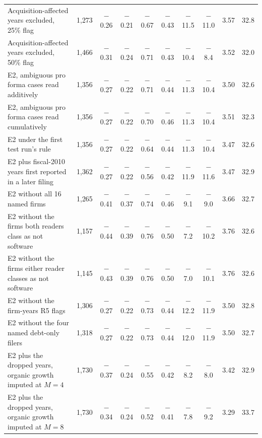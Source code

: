 \begin{table}[t]
\begin{tabular}{@{}>{\raggedright\arraybackslash}p{5.4cm}rcccccccc@{}}
Acquisition-affected years excluded, 25\% flag & 1{,}273 & $-$0.26 & $-$0.21 & $-$0.67 & $-$0.43 & $-$11.5 & $-$11.0 & 3.57 & 32.8 \\
Acquisition-affected years excluded, 50\% flag & 1{,}466 & $-$0.31 & $-$0.24 & $-$0.71 & $-$0.43 & $-$10.4 & $-$8.4 & 3.52 & 32.0 \\
E2, ambiguous pro forma cases read additively & 1{,}356 & $-$0.27 & $-$0.22 & $-$0.71 & $-$0.44 & $-$11.3 & $-$10.4 & 3.50 & 32.6 \\
E2, ambiguous pro forma cases read cumulatively & 1{,}356 & $-$0.27 & $-$0.22 & $-$0.70 & $-$0.46 & $-$11.3 & $-$10.4 & 3.51 & 32.3 \\
E2 under the first test run's rule & 1{,}356 & $-$0.27 & $-$0.22 & $-$0.64 & $-$0.44 & $-$11.3 & $-$10.4 & 3.47 & 32.6 \\
E2 plus fiscal-2010 years first reported in a later filing & 1{,}362 & $-$0.27 & $-$0.22 & $-$0.56 & $-$0.42 & $-$11.9 & $-$11.6 & 3.47 & 32.9 \\
E2 without all 16 named firms & 1{,}265 & $-$0.41 & $-$0.37 & $-$0.74 & $-$0.46 & $-$9.1 & $-$9.0 & 3.66 & 32.7 \\
E2 without the firms both readers class as not software & 1{,}157 & $-$0.44 & $-$0.39 & $-$0.76 & $-$0.50 & $-$7.2 & $-$10.2 & 3.76 & 32.6 \\
E2 without the firms either reader classes as not software & 1{,}145 & $-$0.43 & $-$0.39 & $-$0.76 & $-$0.50 & $-$7.0 & $-$10.1 & 3.76 & 32.6 \\
E2 without the firm-years R5 flags & 1{,}306 & $-$0.27 & $-$0.22 & $-$0.73 & $-$0.44 & $-$12.2 & $-$11.9 & 3.50 & 32.8 \\
E2 without the four named debt-only filers & 1{,}318 & $-$0.27 & $-$0.22 & $-$0.73 & $-$0.44 & $-$12.0 & $-$11.9 & 3.50 & 32.7 \\
E2 plus the dropped years, organic growth imputed at $M=4$ & 1{,}730 & $-$0.37 & $-$0.24 & $-$0.55 & $-$0.42 & $-$8.2 & $-$8.0 & 3.42 & 32.9 \\
E2 plus the dropped years, organic growth imputed at $M=8$ & 1{,}730 & $-$0.34 & $-$0.24 & $-$0.52 & $-$0.41 & $-$7.8 & $-$9.2 & 3.29 & 33.7 \\
\bottomrule\end{tabular}

\end{table}
